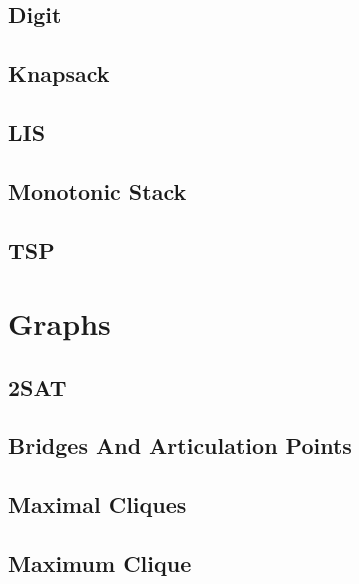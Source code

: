 \subsection{Digit}
\raggedbottom
\hrulefill
\subsection{Knapsack}
\raggedbottom
\hrulefill
\subsection{LIS}
\raggedbottom
\hrulefill
\subsection{Monotonic Stack}
\raggedbottom
\hrulefill
\subsection{TSP}
\raggedbottom
\hrulefill
\newpage

\section{Graphs}
\subsection{2SAT}
\raggedbottom
\hrulefill
\subsection{Bridges And Articulation Points}
\raggedbottom
\hrulefill
\subsection{Maximal Cliques}
\raggedbottom
\hrulefill
\subsection{Maximum Clique}
\raggedbottom
\hrulefill
